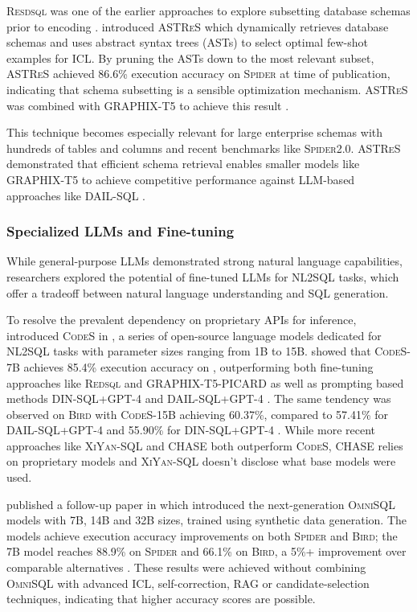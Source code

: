\textsc{Resdsql} was one of the earlier approaches to explore subsetting
database schemas prior to encoding \citep{RESDSQL}. \cite{RetAug} introduced
\textsc{ASTReS} which dynamically retrieves database schemas and uses abstract
syntax trees (ASTs) to select optimal few-shot examples for ICL. By pruning the
ASTs down to the most relevant subset, \textsc{ASTReS} achieved 86.6\%
execution accuracy on \textsc{Spider} at time of publication, indicating that
schema subsetting is a sensible optimization mechanism. \textsc{ASTReS} was
combined with GRAPHIX-T5 to achieve this result \citep{RetAug}.

This technique becomes especially relevant for large enterprise schemas with
hundreds of tables and columns and recent benchmarks like \textsc{Spider2.0}.
\textsc{ASTReS} demonstrated that efficient schema retrieval enables smaller
models like GRAPHIX-T5 to achieve competitive performance against LLM-based
approaches like DAIL-SQL \citep{DAIL-SQL, RetAug}.

\subsubsection{Specialized LLMs and Fine-tuning}

While general-purpose LLMs demonstrated strong natural language capabilities,
researchers explored the potential of fine-tuned LLMs for NL2SQL tasks, which
offer a tradeoff between natural language understanding and SQL generation.

To resolve the prevalent dependency on proprietary APIs for inference,
\cite{CodeS} introduced \textsc{CodeS} in \citeyear{CodeS}, a series of
open-source language models dedicated for NL2SQL tasks with parameter
sizes ranging from 1B to 15B. \cite{CodeS} showed that \textsc{CodeS}-7B
achieves 85.4\% execution accuracy on \Spider, outperforming both
fine-tuning approaches like \textsc{Redsql} and GRAPHIX-T5-PICARD as well as
prompting based methods DIN-SQL+GPT-4 and DAIL-SQL+GPT-4 \citep{CodeS}. The
same tendency was observed on \textsc{Bird} with \textsc{CodeS}-15B achieving
60.37\%, compared to 57.41\% for DAIL-SQL+GPT-4 and 55.90\% for DIN-SQL+GPT-4
\citep{CodeS}. While more recent approaches like \textsc{XiYan-SQL} and CHASE
both outperform \textsc{CodeS}, CHASE relies on proprietary models and
\textsc{XiYan-SQL} doesn't disclose what base models were used.

\citeauthor*{OmniSQL} published a follow-up paper in \citeyear{OmniSQL} which
introduced the next-generation \textsc{OmniSQL} models with 7B, 14B and 32B
sizes, trained using synthetic data generation. The models achieve execution
accuracy improvements on both \textsc{Spider} and \textsc{Bird}; the 7B model
reaches 88.9\% on \textsc{Spider} and 66.1\% on \textsc{Bird}, a 5\%+
improvement over comparable alternatives \citep{OmniSQL}. These results were
achieved without combining \textsc{OmniSQL} with advanced ICL, self-correction,
RAG or candidate-selection techniques, indicating that higher accuracy scores
are possible.

